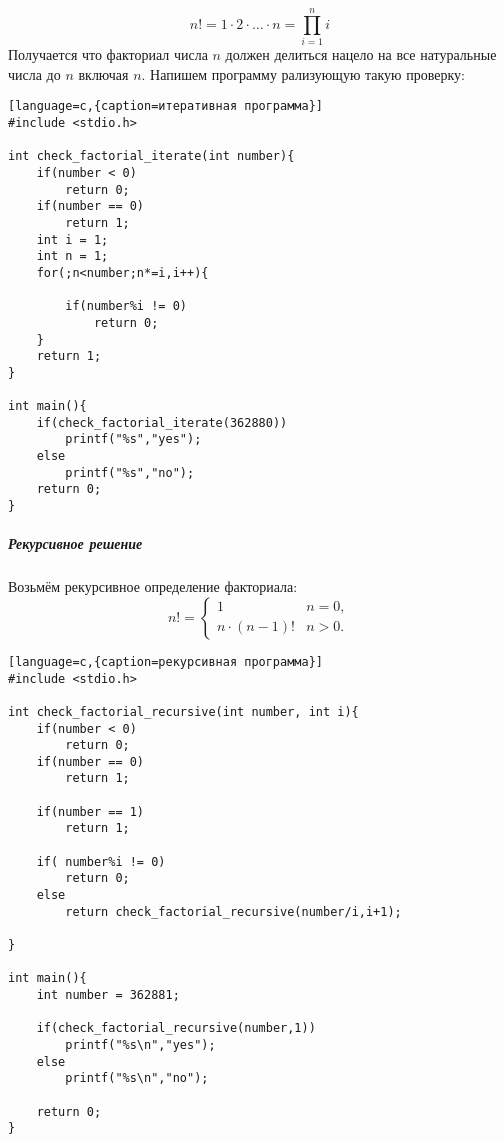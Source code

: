 \documentclass[a4paper,12pt]{article}
\begin{document}
\begin{equation}
n! = 1\cdot 2\cdot\ldots\cdot n =\prod_{i=1}^n i
\end{equation}
Получается что факториал числа $n$ должен делиться нацело на все натуральные числа до $n$ включая $n$. Напишем программу рализующую такую проверку:

\begin{lstlisting}[language=c,{caption=итеративная программа}]
#include <stdio.h>

int check_factorial_iterate(int number){
	if(number < 0) 
		return 0;
	if(number == 0) 
		return 1;
	int i = 1;
	int n = 1;
	for(;n<number;n*=i,i++){
		
		if(number%i != 0)
			return 0;
	}
	return 1;
}

int main(){
	if(check_factorial_iterate(362880))
		printf("%s","yes");
	else
		printf("%s","no");
	return 0;
}
\end{lstlisting}

\subparagraph{Рекурсивное решение}
Возьмём рекурсивное определение факториала:
\begin{equation}
n!= \begin{cases}
1 & n = 0,\\
n \cdot (n-1)! & n > 0.
\end{cases}
\end{equation}

\begin{lstlisting}[language=c,{caption=рекурсивная программа}]
#include <stdio.h>

int check_factorial_recursive(int number, int i){
	if(number < 0) 
		return 0;	
	if(number == 0)
		return 1;

	if(number == 1)
		return 1;
	
	if( number%i != 0)
		return 0;
	else		
		return check_factorial_recursive(number/i,i+1);
	
}

int main(){
	int number = 362881;

	if(check_factorial_recursive(number,1))
		printf("%s\n","yes");
	else
		printf("%s\n","no");

	return 0;
}
\end{lstlisting}
\end{document}
